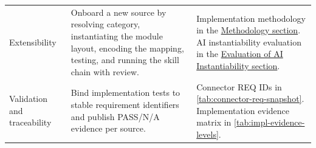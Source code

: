\begin{center}
\begin{minipage}{\textwidth}
\begin{tabularx}{\textwidth}{l X X}
Extensibility & Onboard a new source by resolving category, instantiating the module layout, encoding the mapping, testing, and running the skill chain with review. & Implementation methodology in the \hyperref[sec:impl-methodology]{Methodology section}. AI instantiability evaluation in the \hyperref[sec:ai-eval]{Evaluation of AI Instantiability section}. \\
Validation and traceability & Bind implementation tests to stable requirement identifiers and publish PASS/N/A evidence per source. & Connector REQ IDs in \autoref{tab:connector-req-snapshot}. Implementation evidence matrix in \autoref{tab:impl-evidence-levels}. \\
\bottomrule
\end{tabularx}
\end{minipage}
\end{center}

